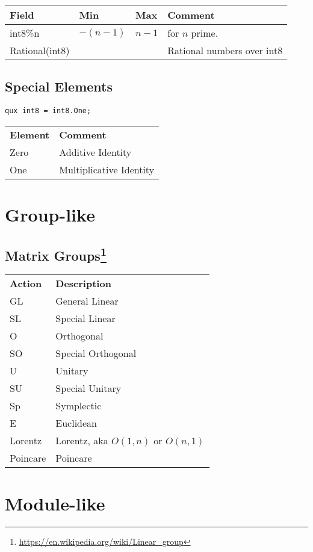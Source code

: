 \documentclass{amsbook}
\begin{document}
\begin{tabular}{l|l|l|l}
  \textbf{Field} & \textbf{Min} & \textbf{Max} & \textbf{Comment}\\
  \hline
  int8\%n &  $-(n-1)$ & $n-1$ & for $n$ prime. \\
  Rational(int8) & & & Rational numbers over int8 \\
\end{tabular}

\subsection{Special Elements}
\begin{verbatim}
qux int8 = int8.One;
\end{verbatim}
\begin{tabular}{l|l}
  \textbf{Element} & \textbf{Comment} \\
  Zero & Additive Identity \\
  One & Multiplicative Identity \\
\end{tabular}

\section{Group-like}
\subsection{Matrix Groups\protect\footnote{\url{https://en.wikipedia.org/wiki/Linear_group}}}\hfill

\begin{tabular}{ll}
  \textbf{Action} & \textbf{Description} \\
  GL & General Linear \\
  SL & Special Linear \\
  O  & Orthogonal \\
  SO & Special Orthogonal \\
  U  & Unitary \\
  SU & Special Unitary \\
  Sp & Symplectic \\
  E  & Euclidean \\
  Lorentz & Lorentz, aka $O(1, n)$ or $O(n, 1)$ \\
  Poincare & Poincare \\
\end{tabular}


\section{Module-like}
\end{document}
